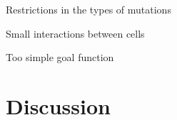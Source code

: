 \documentclass[10pt,a4paper]{article}
\begin{document}
Restrictions in the types of mutations

Small interactions between cells

Too simple goal function



\section{Discussion}
\label{sec:discussion}


%	
%	
%	
%	
%	
\end{document}
